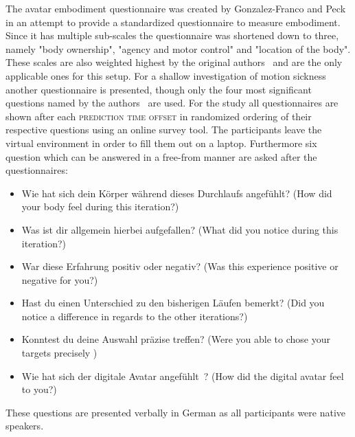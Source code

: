 \documentclass[sigconf]{acmart}
\begin{document}
The avatar embodiment questionnaire was created by Gonzalez-Franco and Peck~\cite{Gonzalez-Franco2018} in an attempt to provide a standardized questionnaire to measure embodiment.
Since it has multiple sub-scales the questionnaire was shortened down to three, namely "body ownership", "agency and motor control" and "location of the body". 
These scales are also weighted highest by the original authors~\cite{Gonzalez-Franco2018} and are the only applicable ones for this setup. 
For a shallow investigation of motion sickness another questionnaire is presented, though only the four most significant questions named by the authors~\cite{Gianaros2001} are used.
For the study all questionnaires are shown after each \textsc{prediction time offset} in randomized ordering of their respective questions using an online survey tool. The participants leave the virtual environment in order to fill them out on a laptop.
Furthermore six question which can be answered in a free-from manner are asked after the questionnaires: 

 \begin{itemize}
 \item Wie hat sich dein Körper während dieses Durchlaufs angefühlt?
 (How did your body feel during this iteration?)
 \item Was ist dir allgemein hierbei aufgefallen?
 (What did you notice during this iteration?)
 \item War diese Erfahrung positiv oder negativ?
 (Was this experience positive or negative for you?)
 \item Hast du einen Unterschied zu den bisherigen Läufen bemerkt?
 (Did you notice a difference in regards to the other iterations?)
 \item Konntest du deine Auswahl präzise treffen?
 (Were you able to chose your targets precisely )
 \item Wie hat sich der digitale Avatar angefühlt~?
 (How did the digital avatar feel to you?)
 \end{itemize}
 
 These questions are presented verbally in German as all participants were native speakers.
\end{document}
